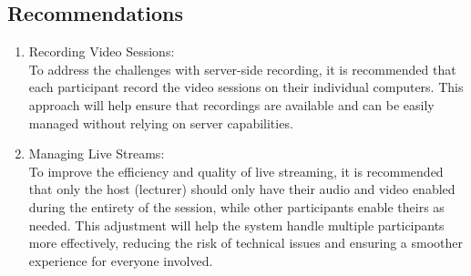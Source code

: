 \documentclass[a4paper,12pt]{article}  %
\begin{document}
\subsection*{Recommendations}
\begin{enumerate}
      \item  Recording Video Sessions:\\
      To address the challenges with server-side recording, it is recommended that each participant record the video sessions on their individual computers. This approach will help ensure that recordings are available and can be easily managed without relying on server capabilities.\\
      \item Managing Live Streams:\\
      To improve the efficiency and quality of live streaming, it is recommended that only the host (lecturer) should only have their audio and video enabled during the entirety of the session, while other participants enable theirs as needed. This adjustment will help the system handle multiple participants more effectively, reducing the risk of technical issues and ensuring a smoother experience for everyone involved.\\
\end{enumerate}

\newpage


\end{document}
